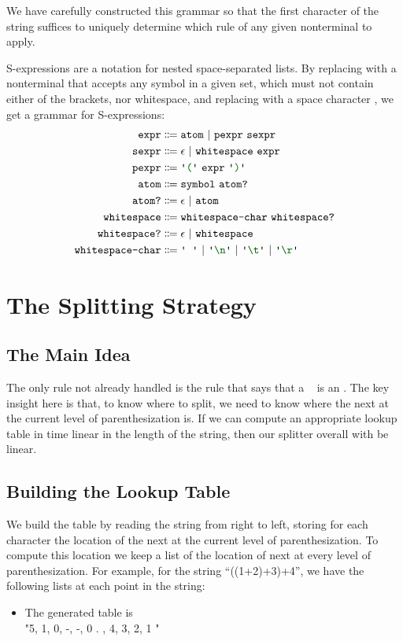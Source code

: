   We have carefully constructed this grammar so that the first character of the string suffices to uniquely determine which rule of any given nonterminal to apply.
  
  S-expressions are a notation for nested space-separated lists.  By replacing  with a nonterminal that accepts any symbol in a given set, which must not contain either of the brackets, nor whitespace, and replacing \terminal{+} with a space character \terminal{\ }, we get a grammar for S-expressions:
  \begin{align*}
    \nt{expr} & \Coloneqq \nt{atom}~|~\nt{pexpr}~\nt{sexpr} \\
    \nt{sexpr} & \Coloneqq \epsilon~|~\nt{whitespace}~\nt{expr} \\
    \nt{pexpr} & \Coloneqq \terminal{(}~\nt{expr}~\terminal{)} \\
    \nt{atom} & \Coloneqq \nt{symbol}~\nt{atom?} \\
    \nt{atom?} & \Coloneqq \epsilon~|~\nt{atom} \\
    \nt{whitespace} & \Coloneqq \nt{whitespace-char}~\nt{whitespace?} \\
    \nt{whitespace?} & \Coloneqq \epsilon~|~\nt{whitespace} \\
    \nt{whitespace-char} & \Coloneqq \terminal{\ }~|~\terminal{\textbackslash n}~|~\terminal{\textbackslash t}~|~\terminal{\textbackslash r}
  \end{align*}
  
\section{The Splitting Strategy}
  \subsection{The Main Idea}
    The only rule not already handled is the rule that says that a ~ is an .  The key insight here is that, to know where to split, we need to know where the next \terminal{+} at the current level of parenthesization is.  If we can compute an appropriate lookup table in time linear in the length of the string, then our splitter overall with be linear.
    
  \subsection{Building the Lookup Table}
    We build the table by reading the string from right to left, storing for each character the location of the next \terminal{+} at the current level of parenthesization.  To compute this location we keep a list of the location of next \terminal{+} at every level of parenthesization.  For example, for the string ``((1+2)+3)+4'', we have the following lists at each point in the string:
      \begin{itemize} \item  The generated table is  \\
          "5, 1, 0, -, -, 0 .
            , 4, 3, 2, 1
          "
    \end{itemize}
    
